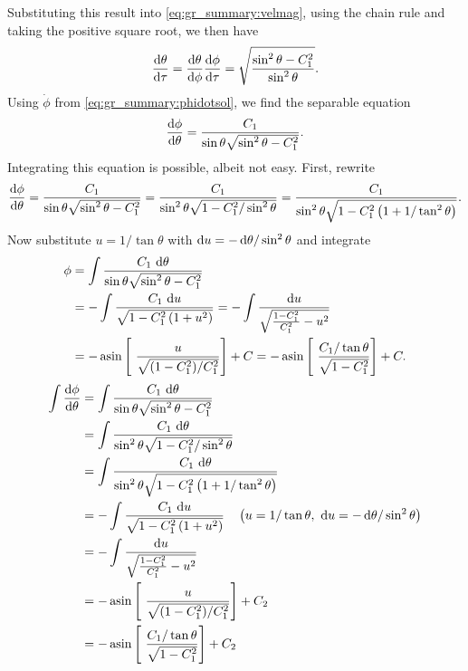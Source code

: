 Substituting this result into \cref{eq:gr_summary:velmag}, using the chain rule and taking the positive square root, we then have
\begin{equation}
	\odv\theta\tau = \odv\theta\phi \odv\phi\tau = \sqrt{\frac{\sin^2\theta - C_1^2}{\sin^2\theta}} .
\end{equation}
Using $\dot\phi$ from \cref{eq:gr_summary:phidotsol}, we find the separable equation
\begin{equation}
	\odv\phi\theta = \frac{C_1}{\sin\theta \sqrt{\sin^2\theta - C_1^2}}.
\end{equation}
Integrating this equation is possible, albeit not easy.
First, rewrite
\begin{equation}
	  \odv{\phi}{\theta}
	= \frac{C_1}{\sin\theta \sqrt{\sin^2\theta - C_1^2}}
	= \frac{C_1}{\sin^2\theta \sqrt{1 - C_1^2 / \sin^2 \theta}}
	= \frac{C_1}{\sin^2\theta \sqrt{1 - C_1^2 \left( 1 + 1/\tan^2\theta \right)}}.
\end{equation}
Now substitute $u = 1/\tan\theta$ with $\mathop{}\!\mathrm{d} u = - \mathop{}\!\mathrm{d} \theta / \sin^2\theta$ and integrate
\begin{equation}
\begin{aligned}
	\phi &= \int \frac{C_1 \, \dif \theta}{\sin\theta \sqrt{\sin^2\theta - C_1^2}} \\
	     &= -\int \frac{C_1 \, \dif u}{\sqrt{1 - C_1^2 \left( 1 + u^2 \right)}} = -\int \frac{\dif u}{\sqrt{\frac{1 - C_1^2}{C_1^2} - u^2}} \\
	     &= -\asin \left[ \frac{u}{\sqrt{(1-C_1^2)/C_1^2}} \right] + C = -\asin \left[ \frac{C_1 / \tan\theta}{\sqrt{1-C_1^2}} \right] + C.
\end{aligned}
\end{equation}
\iffalse
\begin{equation}
\begin{aligned}
	\int \odv\phi\theta &=  \int \frac{C_1 \, \dif \theta}{\sin\theta \sqrt{\sin^2\theta - C_1^2}} \\
	                    &=  \int \frac{C_1 \, \dif \theta}{\sin^2\theta \sqrt{1 - C_1^2 / \sin^2 \theta}} \\
	                    &=  \int \frac{C_1 \, \dif \theta}{\sin^2\theta \sqrt{1 - C_1^2 \left( 1 + 1/\tan^2\theta \right)}} \\
	                    &= -\int \frac{C_1 \, \dif u}{\sqrt{1 - C_1^2 \left( 1 + u^2 \right)}} \quad \left( u = 1/\tan\theta, \,\, \dif u = -\dif \theta / \sin^2 \theta \right) \\
	                    &= -\int \frac{\dif u}{\sqrt{\frac{1 - C_1^2}{C_1^2} - u^2}} \\
	                    &= -\asin \left[ \frac{u}{\sqrt{(1-C_1^2)/C_1^2}} \right] + C_2 \\
	                    &= -\asin \left[ \frac{C_1 / \tan\theta}{\sqrt{1-C_1^2}} \right] + C_2 \\
\end{aligned}
\end{equation}
